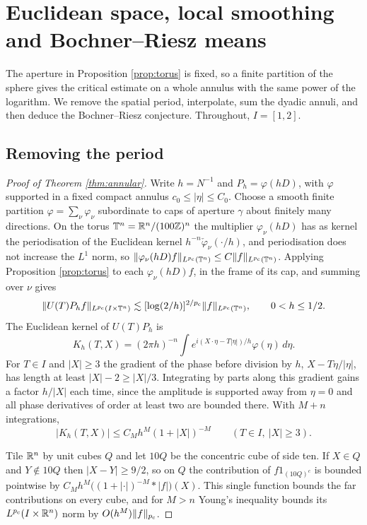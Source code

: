 \section{Euclidean space, local smoothing and Bochner--Riesz means}\label{sec:euclid}

The aperture in Proposition \ref{prop:torus} is fixed, so a finite partition of the sphere gives
the critical estimate on a whole annulus with the same power of the logarithm. We remove the
spatial period, interpolate, sum the dyadic annuli, and then deduce the Bochner--Riesz
conjecture. Throughout, $I=[1,2]$.

\subsection{Removing the period}\label{ssec:period}
\begin{proof}[Proof of Theorem \ref{thm:annular}]
Write $h=N^{-1}$ and $P_h=\varphi(hD)$, with $\varphi$ supported in a fixed compact annulus
$c_0\le|\eta|\le C_0$. Choose a smooth finite partition $\varphi=\sum_\nu\varphi_\nu$ subordinate to
caps of aperture $\gamma$ about finitely many directions. On the torus $\mathbb{T}^n=\mathbb{R}^n/(100\mathbb{Z})^n$ the
multiplier $\varphi_\nu(hD)$ has as kernel the periodisation of the Euclidean kernel
$h^{-n}\check\varphi_\nu(\cdot/h)$, and periodisation does not increase the $L^1$ norm, so
$\|\varphi_\nu(hD)f\|_{L^{p_{\mathrm c}}(\mathbb{T}^n)}\le C\|f\|_{L^{p_{\mathrm c}}(\mathbb{T}^n)}$. Applying Proposition \ref{prop:torus}
to each $\varphi_\nu(hD)f$, in the frame of its cap, and summing over $\nu$ gives
\begin{equation}\label{eq:torusall}
\|U(T)P_hf\|_{L^{p_{\mathrm c}}(I\times\mathbb{T}^n)}\lesssim[\log(2/h)]^{2/p_{\mathrm c}}\|f\|_{L^{p_{\mathrm c}}(\mathbb{T}^n)},\qquad0<h\le1/2 .
\end{equation}
The Euclidean kernel of $U(T)P_h$ is
\[
K_h(T,X)=(2\pi h)^{-n}\int e^{i(X\cdot\eta-T|\eta|)/h}\varphi(\eta)\,d\eta .
\]
For $T\in I$ and $|X|\ge3$ the gradient of the phase before division by $h$, $X-T\eta/|\eta|$, has
length at least $|X|-2\ge|X|/3$. Integrating by parts along this gradient gains a factor $h/|X|$
each time, since the amplitude is supported away from $\eta=0$ and all phase derivatives of order
at least two are bounded there. With $M+n$ integrations,
\begin{equation}\label{eq:Kdecay}
|K_h(T,X)|\le C_Mh^M(1+|X|)^{-M}\qquad(T\in I,\ |X|\ge3).
\end{equation}

Tile $\mathbb{R}^n$ by unit cubes $Q$ and let $10Q$ be the concentric cube of side ten. If $X\in Q$ and
$Y\notin10Q$ then $|X-Y|\ge9/2$, so on $Q$ the contribution of $f1_{(10Q)^c}$ is bounded pointwise by
$C_Mh^M\bigl((1+|\cdot|)^{-M}*|f|\bigr)(X)$. This single function bounds the far contributions on every
cube, and for $M>n$ Young's inequality bounds its $L^{p_{\mathrm c}}(I\times\mathbb{R}^n)$ norm by $O(h^M)\|f\|_{p_{\mathrm c}}$.


\end{proof}
